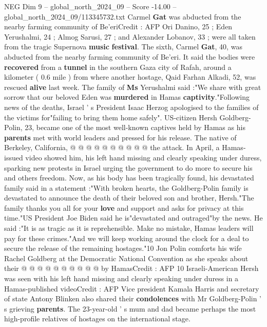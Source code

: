 \begin{textsample}{NEG Dim 9 – global\_north\_2024\_09 – Score -14.00 – global\_north\_2024\_09/113345732.txt}  \label{ex:f9_neg_003}
Carmel \textbf{Gat} was abducted from the nearby farming community of Be'eriCredit : AFP Ori Danino, 25 ; Eden Yerushalmi, 24 ; Almog Sarusi, 27 ; and Alexander Lobanov, 33 ; were all taken from the tragic Supernova \textbf{music} \textbf{festival}.
The sixth, Carmel \textbf{Gat}, 40, was abducted from the nearby farming community of Be'eri.
It said the bodies were \textbf{recovered} from a \textbf{tunnel} in the southern Gaza city of Rafah, around a kilometer ( 0.6 mile ) from where another hostage, Qaid Farhan Alkadi, 52, was rescued \textbf{alive} last week.
The family of \textbf{Ms} Yerushalmi said :"We share with great sorrow that our beloved Eden was \textbf{murdered} in Hamas \textbf{captivity}."Following news of the deaths, Israel ' s President Isaac Herzog apologised to the families of the victims for"failing to bring them home safely".
US-citizen Hersh Goldberg-Polin, 23, became one of the most well-known captives held by Hamas as his \textbf{parents} met with world leaders and pressed for his release.
The native of Berkeley, California, @ @ @ @ @ @ @ @ @ @ the attack.
In April, a Hamas-issued video showed him, his left hand missing and clearly speaking under duress, sparking new protests in Israel urging the government to do more to secure his and others freedom.
Now, as his body has been tragically found, his devastated family said in a statement :"With broken hearts, the Goldberg-Polin family is devastated to announce the death of their beloved son and brother, Hersh."The family thanks you all for your \textbf{love} and support and asks for privacy at this time."US President Joe Biden said he is"devastated and outraged"by the news.
He said :"It is as tragic as it is reprehensible.
Make no mistake, Hamas leaders will pay for these crimes."And we will keep working around the clock for a deal to secure the release of the remaining hostages."10 Jon Polin comforts his wife Rachel Goldberg at the Democratic National Convention as she speaks about their @ @ @ @ @ @ @ @ @ @ by HamasCredit : AFP 10 Israeli-American Hersh was seen with his left hand missing and clearly speaking under duress in a Hamas-published videoCredit : AFP Vice president Kamala Harris and secretary of state Antony Blinken also shared their \textbf{condolences} with Mr Goldberg-Polin ' s grieving \textbf{parents}.
The 23-year-old ' s mum and dad became perhaps the most high-profile relatives of hostages on the international stage.

\end{textsample}
